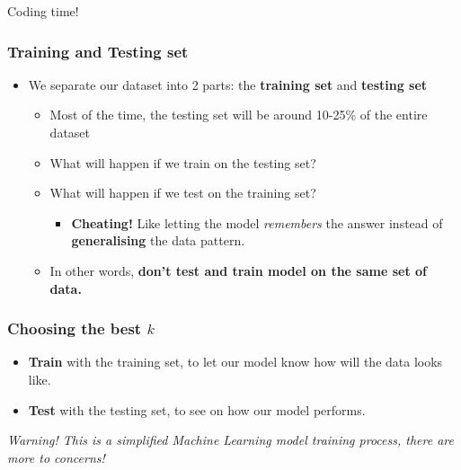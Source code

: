 \documentclass[aspectratio=169]{beamer}
\begin{document}
\begin{frame}
	\Huge{Coding time!}
\end{frame}

\begin{frame}
	\frametitle{Training and Testing set}
	\begin{itemize}
		\item<2-> We separate our dataset into 2 parts: the \textbf{training set} and \textbf{testing set}
		      \begin{itemize}
			      \item<3-> Most of the time, the testing set will be around 10-25\% of the entire dataset
			      \item<4-> What will happen if we train on the testing set?
			      \item<5-> What will happen if we test on the training set?
			            \begin{itemize}
				            \item<6-> \textbf{Cheating!} Like letting the model \textit{remembers} the answer instead of \textbf{generalising} the data pattern.
			            \end{itemize}
			      \item<7-> In other words, \textbf{don't test and train model on the same set of data.}
		      \end{itemize}
	\end{itemize}
\end{frame}

\begin{frame}
	\frametitle{Choosing the best $k$}
	\begin{itemize}
		\item<2-> \textbf{Train} with the training set, to let our model know how will the data looks like.
		\item<3-> \textbf{Test} with the testing set, to see on how our model performs.
	\end{itemize}
	\tiny{\textit{Warning! This is a simplified Machine Learning model training process, there are more to concerns!}}
\end{frame}
\end{document}

